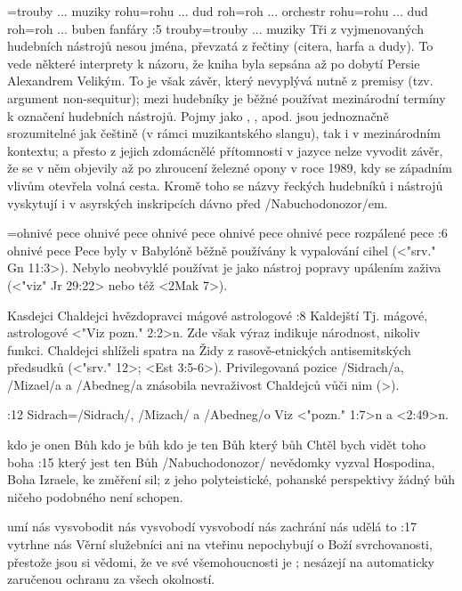 ={trouby ... muziky}  %
    {rohu}={rohu ... dud} %
    {roh}={roh ... orchestr}  %
    {rohu}={rohu ... dud} %
    {roh}={roh ... buben}  %
    {fanfáry}  %
:5 {trouby}={trouby ... muziky} Tři z vyjmenovaných  hudebních nástrojů  nesou jména, převzatá z řečtiny (citera, harfa a dudy). To vede některé interprety k názoru, že kniha byla sepsána až po dobytí Persie Alexandrem Velikým. 
To je však závěr, který nevyplývá nutně z premisy (tzv. argument non-sequitur); mezi hudebníky je běžné používat mezinárodní termíny k označení hudebních nástrojů. Pojmy jako  ,  ,  apod. jsou jednoznačně srozumitelné jak češtině (v rámci muzikantského slangu), tak i v mezinárodním kontextu; a přesto z jejich zdomácnělé přítomnosti v jazyce nelze vyvodit závěr, že se v něm objevily až po zhroucení železné opony v roce 1989, kdy se západním vlivům otevřela volná cesta. 
Kromě toho se názvy řeckých hudebníků i nástrojů vyskytují i v asyrských inskripcích dávno před \x/Nabuchodonozor/em. 


={ohnivé pece} %
    {ohnivé pece} %
    {ohnivé pece} %
    {ohnivé pece} %
    {ohnivé pece} %
    {rozpálené pece} %
:6 {ohnivé pece} Pece byly v Babylóně běžně používány k vypalování cihel  (<"srv." Gn 11:3>). Nebylo neobvyklé používat je jako nástroj popravy upálením zaživa (<"viz" Jr 29:22> nebo též <2Mak 7>).  

    {Kasdejci} %
    {Chaldejci}  %
    {hvězdopravci} %
    {mágové}  %
    {astrologové}  %
:8 {Kaldejští} Tj. mágové, astrologové <"Viz pozn." 2:2>n.  %
 Zde však výraz  indikuje národnost, nikoliv funkci. Chaldejci shlíželi spatra na Židy z rasově-etnických antisemitských předsudků (<"srv." 12>; <Est 3:5-6>). Privilegovaná pozice \x/Sidrach/a, \x/Mizael/a a  \x/Abedneg/a znásobila nevraživost Chaldejců vůči nim (>).

:12 {Sidrach}={\x/Sidrach/, \x/Mizach/ a \x/Abedneg/o} Viz <"pozn." 1:7>n a <2:49>n. 

    {kdo je onen Bůh} %
    {kdo je bůh}  %
    {kdo je ten Bůh} %
    {který bůh}  %
    {Chtěl bych vidět toho boha}  %
:15 {který jest ten Bůh} \x/Nabuchodonozor/ nevědomky vyzval Hospodina, Boha Izraele, ke změření sil; z jeho polyteistické, pohanské perspektivy žádný bůh ničeho podobného není schopen.


    {umí nás vysvobodit} %
    {nás vysvobodí}  %
    {vysvobodí nás} %
    {zachrání nás}  %
    {udělá to}  %
:17  {vytrhne nás} Věrní služebníci ani na vteřinu nepochybují o Boží svrchovanosti, přestože jsou si vědomi, že ve své všemohoucnosti je ; nesázejí na automaticky zaručenou ochranu za všech okolností. 

